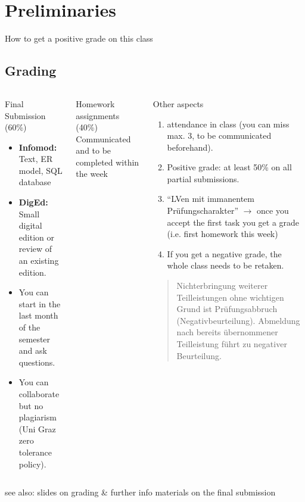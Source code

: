 \section{Preliminaries}
\begin{frame}{How to get a positive grade on this class}
\subsection{Grading}

  \begin{columns}[T,onlytextwidth]
      \begin{exampleblock}{Final Submission (60\%)}
\begin{itemize}\footnotesize
\item \textbf{Infomod:} Text, ER model, SQL database
\item \textbf{DigEd:} Small digital edition or review of an existing edition.
\item You can start in the last month of the semester and ask questions.
\item You can collaborate but no plagiarism (Uni Graz zero tolerance policy).
\end{itemize}
\end{exampleblock}

\begin{exampleblock}{Homework assignments (40\%)}\footnotesize
Communicated and to be completed within the week
\end{exampleblock}

      \begin{alertblock}{Other aspects}
\begin{enumerate}\scriptsize
    \item attendance in class (you can miss max. 3, to be communicated beforehand).
    \item Positive grade: at least 50\%  on all partial submissions.
    \item ``LVen mit immanentem Prüfungscharakter'' $\to$ once you accept the first task you get a grade (i.e. first homework this week)
    \item If you get a negative grade, the whole class needs to be retaken.
\end{enumerate}

\begin{quote}\scriptsize
    Nichterbringung weiterer Teilleistungen ohne wichtigen Grund ist Prüfungsabbruch (Negativbeurteilung). Abmeldung nach bereits übernommener Teilleistung führt zu negativer Beurteilung.
\end{quote}
\end{alertblock}

\end{columns}

\small 
see also: slides on grading \& further info materials on the final submission
    
\end{frame}


